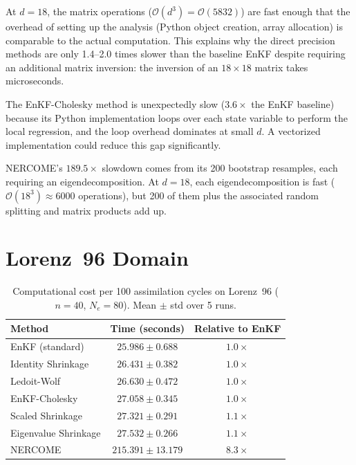 At $d = 18$, the matrix operations ($\mathcal{O}(d^3) = \mathcal{O}(5832)$) are fast enough that the overhead of setting up the analysis (Python object creation, array allocation) is comparable to the actual computation. This explains why the direct precision methods are only 1.4--2.0 times slower than the baseline EnKF despite requiring an additional matrix inversion: the inversion of an $18 \times 18$ matrix takes microseconds.

The EnKF-Cholesky method is unexpectedly slow ($3.6\times$ the EnKF baseline) because its Python implementation loops over each state variable to perform the local regression, and the loop overhead dominates at small $d$. A vectorized implementation could reduce this gap significantly.

NERCOME's $189.5\times$ slowdown comes from its 200 bootstrap resamples, each requiring an eigendecomposition. At $d = 18$, each eigendecomposition is fast ($\mathcal{O}(18^3) \approx 6000$ operations), but 200 of them plus the associated random splitting and matrix products add up.

\section{Lorenz~96 Domain}

\begin{table}[htbp]
\centering
\caption{Computational cost per 100 assimilation cycles on Lorenz~96 ($n = 40$, $N_e = 80$). Mean $\pm$ std over 5 runs.}
\label{tab:app_timing_lorenz}
\begin{tabular}{@{}lcc@{}}
\toprule
Method & Time (seconds) & Relative to EnKF \\
\midrule
EnKF (standard)          & $25.986 \pm 0.688$ & $1.0\times$ \\
Identity Shrinkage       & $26.431 \pm 0.382$ & $1.0\times$ \\
Ledoit-Wolf              & $26.630 \pm 0.472$ & $1.0\times$ \\
EnKF-Cholesky            & $27.058 \pm 0.345$ & $1.0\times$ \\
Scaled Shrinkage         & $27.321 \pm 0.291$ & $1.1\times$ \\
Eigenvalue Shrinkage     & $27.532 \pm 0.266$ & $1.1\times$ \\
NERCOME                  & $215.391 \pm 13.179$ & $8.3\times$ \\
\bottomrule
\end{tabular}
\end{table}

